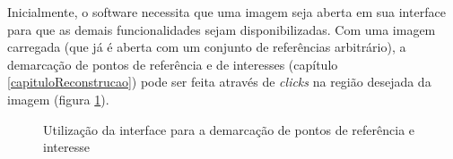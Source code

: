 		Inicialmente, o software necessita que uma imagem seja aberta em sua interface para que as demais funcionalidades sejam disponibilizadas. Com uma imagem carregada (que já é aberta com um conjunto de referências arbitrário), a demarcação de pontos de referência e de interesses (capítulo \ref{capituloReconstrucao}) pode ser feita através de \textit{clicks} na região desejada da imagem (figura \ref{printAppReconstrucaoDemarcacao}).
		
		\begin{figure}[!htb]
			\centering
			\enskip
			\enskip
			\enskip
			\caption{Utilização da interface para a demarcação de pontos de referência e interesse}
			\label{printAppReconstrucaoDemarcacao}
		\end{figure}
		

